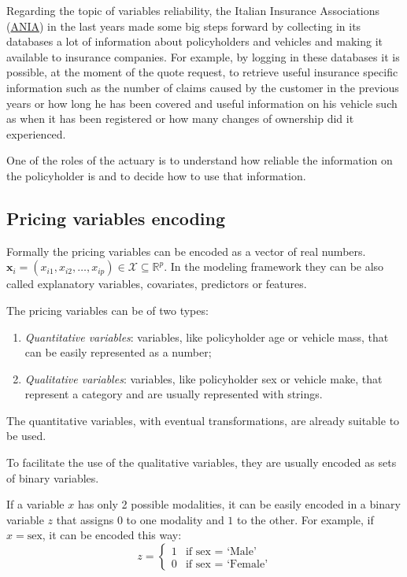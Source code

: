 \documentclass[a4paper, nobind]{templates/ociamthesis}
\providecommand{\tightlist}{%
  \setlength{\itemsep}{0pt}\setlength{\parskip}{0pt}}
\theoremstyle{definition}
\theoremstyle{definition}
\theoremstyle{definition}
\theoremstyle{remark}
\begin{document}
Regarding the topic of variables reliability, the Italian Insurance Associations (\href{https://www.ania.it/}{ANIA}) in the last years made some big steps forward by collecting in its databases a lot of information about policyholders and vehicles and making it available to insurance companies. For example, by logging in these databases it is possible, at the moment of the quote request, to retrieve useful insurance specific information such as the number of claims caused by the customer in the previous years or how long he has been covered and useful information on his vehicle such as when it has been registered or how many changes of ownership did it experienced.

One of the roles of the actuary is to understand how reliable the information on the policyholder is and to decide how to use that information.

\hypertarget{pricing-variables-encoding}{%
\subsection{Pricing variables encoding}\label{pricing-variables-encoding}}

Formally the pricing variables can be encoded as a vector of real numbers. \(\boldsymbol{x}_i=(x_{i1}, x_{i2}, \dots, x_{ip})\in\mathcal{X}\subseteq\mathbb{R}^p\). In the modeling framework they can be also called explanatory variables, covariates, predictors or features.

The pricing variables can be of two types:

\begin{enumerate}
\def\labelenumi{\arabic{enumi}.}
\tightlist
\item
  \emph{Quantitative variables}: variables, like policyholder age or vehicle mass, that can be easily represented as a number;
\item
  \emph{Qualitative variables}: variables, like policyholder sex or vehicle make, that represent a category and are usually represented with strings.
\end{enumerate}

The quantitative variables, with eventual transformations, are already suitable to be used.

To facilitate the use of the qualitative variables, they are usually encoded as sets of binary variables.

If a variable \(x\) has only 2 possible modalities, it can be easily encoded in a binary variable \(z\) that assigns \(0\) to one modality and \(1\) to the other. For example, if \(x = \text{sex}\), it can be encoded this way:
\[
z = \begin{cases}
1 & \text{if } \text{sex } = \text{ `Male'} \\
0 & \text{if } \text{sex } = \text{ `Female'}
\end{cases}
\]
\end{document}
